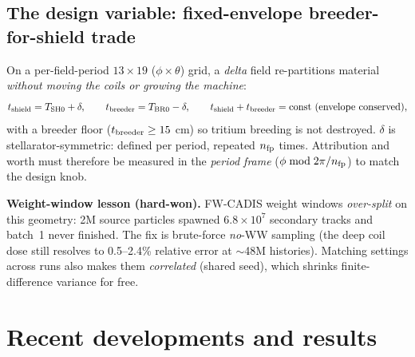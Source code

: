 \documentclass[11pt]{article}
\begin{document}
\subsection{The design variable: fixed-envelope breeder-for-shield trade}
On a per-field-period $13\times19$ ($\phi\times\theta$) grid, a \emph{delta} field re-partitions
material \emph{without moving the coils or growing the machine}:
\begin{equation}
t_{\rm shield}=T_{\rm SH0}+\delta,\qquad t_{\rm breeder}=T_{\rm BR0}-\delta,\qquad
t_{\rm shield}+t_{\rm breeder}=\text{const (envelope conserved)},
\end{equation}
with a breeder floor ($t_{\rm breeder}\ge 15$ cm) so tritium breeding is not destroyed. $\delta$
is stellarator-symmetric: defined per period, repeated $n_{\rm fp}$ times. Attribution and worth
must therefore be measured in the \emph{period frame} ($\phi \bmod 2\pi/n_{\rm fp}$) to match the
design knob.

\begin{key}
\textbf{Weight-window lesson (hard-won).} FW-CADIS weight windows \emph{over-split} on this
geometry: 2M source particles spawned $6.8\times10^{7}$ secondary tracks and batch~1 never
finished. The fix is brute-force \emph{no}-WW sampling (the deep coil dose still resolves to
0.5--2.4\% relative error at $\sim$48M histories). Matching settings across runs also makes them
\emph{correlated} (shared seed), which shrinks finite-difference variance for free.
\end{key}

\section{Recent developments and results}
\label{sec:results}
\end{document}
